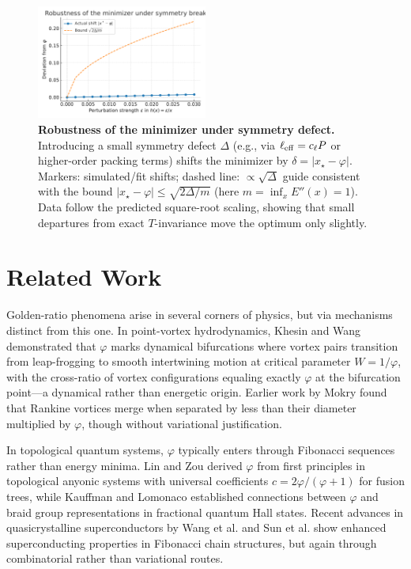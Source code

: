 \documentclass[11pt]{article}
\theoremstyle{remark}
\theoremstyle{definition}
\newcommand{\ph}{\varphi}
\begin{document}
\begin{figure}[t]
  \centering
  \includegraphics[width=0.5\textwidth]{robustness_shift_vs_epsilon.pdf}
  \caption{\textbf{Robustness of the minimizer under symmetry defect.}
    Introducing a small symmetry defect $\Delta$ (e.g., via $\ell_{\rm eff}=c_\ell P$ or higher-order packing terms) shifts the minimizer by $\delta=|x_\star-\varphi|$.
    Markers: simulated/fit shifts; dashed line: $\propto \sqrt{\Delta}$ guide consistent with the bound $|x_\star-\varphi|\le \sqrt{2\Delta/m}$ (here $m=\inf_x E''(x)=1$).
    Data follow the predicted square-root scaling, showing that small departures from exact $T$-invariance move the optimum only slightly.}
  \label{fig:robustness}
\end{figure}

\FloatBarrier

\section{Related Work}
Golden-ratio phenomena arise in several corners of physics, but via mechanisms distinct from this one. In point-vortex hydrodynamics, Khesin and Wang \cite{khesin2021} demonstrated that $\ph$ marks dynamical bifurcations where vortex pairs transition from leap-frogging to smooth intertwining motion at critical parameter $W=1/\ph$, with the cross-ratio of vortex configurations equaling exactly $\ph$ at the bifurcation point---a dynamical rather than energetic origin. Earlier work by Mokry \cite{mokry2008} found that Rankine vortices merge when separated by less than their diameter multiplied by $\ph$, though without variational justification.

In topological quantum systems, $\ph$ typically enters through Fibonacci sequences rather than energy minima. Lin and Zou \cite{lin2021} derived $\ph$ from first principles in topological anyonic systems with universal coefficients $c=2\ph/(\ph+1)$ for fusion trees, while Kauffman and Lomonaco \cite{kauffman2004} established connections between $\ph$ and braid group representations in fractional quantum Hall states. Recent advances in quasicrystalline superconductors by Wang et al. \cite{wang2024} and Sun et al. \cite{sun2023} show enhanced superconducting properties in Fibonacci chain structures, but again through combinatorial rather than variational routes.
\end{document}
